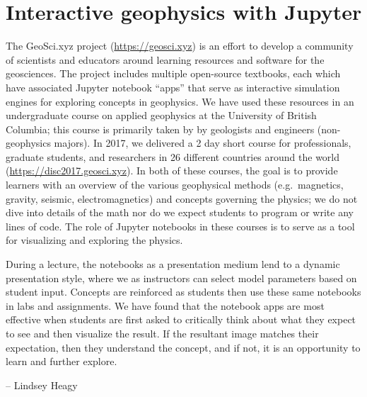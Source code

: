 \documentclass[]{book}
\begin{document}
\section{Interactive geophysics with
Jupyter}\label{interactive-geophysics-with-jupyter}

The GeoSci.xyz project (\url{https://geosci.xyz}) is an effort to
develop a community of scientists and educators around learning
resources and software for the geosciences. The project includes
multiple open-source textbooks, each which have associated Jupyter
notebook ``apps'' that serve as interactive simulation engines for
exploring concepts in geophysics. We have used these resources in an
undergraduate course on applied geophysics at the University of British
Columbia; this course is primarily taken by by geologists and engineers
(non-geophysics majors). In 2017, we delivered a 2 day short course for
professionals, graduate students, and researchers in 26 different
countries around the world (\url{https://disc2017.geosci.xyz}). In both
of these courses, the goal is to provide learners with an overview of
the various geophysical methods (e.g.~magnetics, gravity, seismic,
electromagnetics) and concepts governing the physics; we do not dive
into details of the math nor do we expect students to program or write
any lines of code. The role of Jupyter notebooks in these courses is to
serve as a tool for visualizing and exploring the physics.

During a lecture, the notebooks as a presentation medium lend to a
dynamic presentation style, where we as instructors can select model
parameters based on student input. Concepts are reinforced as students
then use these same notebooks in labs and assignments. We have found
that the notebook apps are most effective when students are first asked
to critically think about what they expect to see and then visualize the
result. If the resultant image matches their expectation, then they
understand the concept, and if not, it is an opportunity to learn and
further explore.

-- Lindsey Heagy
\end{document}
